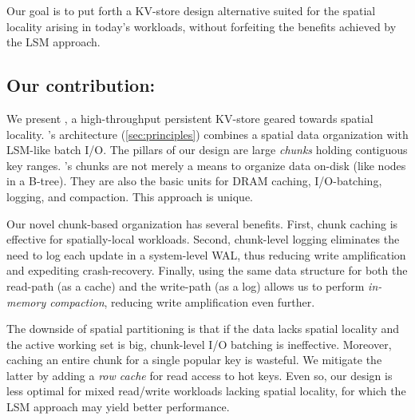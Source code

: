 Our  goal is to 
put forth a KV-store design alternative  suited for the 
spatial locality arising in today's  workloads, without forfeiting the benefits achieved by the LSM approach.




\subsection{Our contribution: \sys}

We present \sys, a high-throughput persistent KV-store geared towards spatial locality. 
\sys's  architecture (\cref{sec:principles}) combines a spatial data organization with LSM-like  batch I/O. 
The pillars of our design are large \emph{chunks} holding contiguous key ranges. 
\sys's chunks are not merely  a means to organize data on-disk (like nodes in a B-tree). They 
are also the basic units for DRAM  caching, I/O-batching, logging, and compaction. 
This approach is unique.

Our novel chunk-based organization has several benefits. 
First, chunk caching is effective for spatially-local workloads.
Second, chunk-level logging eliminates the need to log each update in a system-level WAL, thus 
reducing write amplification and expediting crash-recovery. 
Finally, using the same data structure for both the read-path (as a cache) and the write-path
(as a log) allows us to perform \emph{in-memory compaction}, reducing write amplification even further.

The downside of spatial partitioning is that if the data lacks spatial locality and the active working set is big, 
chunk-level I/O batching is ineffective. Moreover, 
caching an entire chunk for a single popular key is wasteful. 
We mitigate the latter by adding a \emph{row cache} for read access to hot keys. Even so, 
our design is less optimal for mixed read/write workloads lacking spatial locality, for which the LSM approach may yield better performance.  

